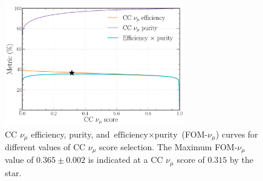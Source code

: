 \begin{figure} %
    \includegraphics[width=0.7\textwidth]{diagrams/7-results/final_numu_eff_curves.pdf}
    \caption[CC $\nu_{\mu}$ efficiency, purity, and $\text{efficiency}\times\text{purity}$ curves]
    {CC $\nu_{\mu}$ efficiency, purity, and $\text{efficiency}\times\text{purity}$
        (FOM-$\nu_{\mu}$) curves for different values of CC $\nu_{\mu}$ score selection. The
        Maximum FOM-$\nu_{\mu}$ value of $0.365\pm0.002$ is indicated at a CC $\nu_{\mu}$ score of
        $0.315$ by the star.}
    \label{fig:final_numu_eff_curves}
\end{figure}

\begin{table}
    \caption[Table showing CC $\nu_{\mu}$ selected event numbers, efficiencies and signal purity]
    {Table showing CC $\nu_{\mu}$ selected event numbers and corresponding efficiencies for the
        various event categories as well as the associated signal purity. Shown are the total
        event numbers, those after the preselection, \emph{cosmic score} cut, and \emph{escapes
        score} cut (Cuts), in addition to the numbers after the FOM-$\nu_{\mu}$ optimised
        selection with the efficiencies relative to the total number of events shown for both. The
        CC $\nu_{\mu}$ signal purity is also shown for each selection.}
    \label{tab:numu_selection}
\end{table}

